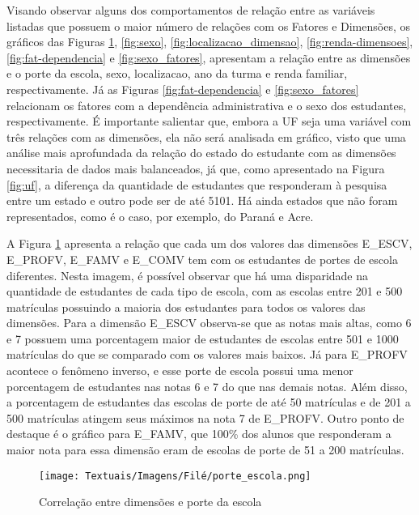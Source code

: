 Visando observar alguns dos comportamentos de relação entre as variáveis listadas que possuem o maior número de relações com os Fatores e Dimensões, os gráficos das Figuras \ref{fig:porte_escola}, \ref{fig:sexo}, \ref{fig:localizacao_dimensao}, \ref{fig:renda-dimensoes}, \ref{fig:fat-dependencia} e \ref{fig:sexo_fatores}, apresentam a relação entre as dimensões e o porte da escola, sexo, localizacao, ano da turma e renda familiar, respectivamente. Já as Figuras \ref{fig:fat-dependencia} e \ref{fig:sexo_fatores} relacionam os fatores com a dependência administrativa e o sexo dos estudantes, respectivamente. É importante salientar que, embora a UF seja uma variável com três relações com as dimensões, ela não será analisada em gráfico, visto que uma análise mais aprofundada da relação do estado do estudante com as dimensões necessitaria de dados mais balanceados, já que, como apresentado na Figura \ref{fig:uf}, a diferença da quantidade de estudantes que responderam à pesquisa entre um estado e outro pode ser de até 5101. Há ainda estados que não foram representados, como é o caso, por exemplo, do Paraná e Acre.

A Figura \ref{fig:porte_escola} apresenta a relação que cada um dos valores das dimensões E\_ESCV, E\_PROFV, E\_FAMV e E\_COMV tem com os estudantes de portes de escola diferentes. Nesta imagem, é possível observar que há uma disparidade na quantidade de estudantes de cada tipo de escola, com as escolas entre 201 e 500 matrículas possuindo a maioria dos estudantes para todos os valores das dimensões. Para a dimensão E\_ESCV observa-se que as notas mais altas, como 6 e 7 possuem uma porcentagem maior de estudantes de escolas entre 501 e 1000 matrículas do que se comparado com os valores mais baixos. Já para E\_PROFV acontece o fenômeno inverso, e esse porte de escola possui uma menor porcentagem de estudantes nas notas 6 e 7 do que nas demais notas. Além disso, a porcentagem de estudantes das escolas de porte de até 50 matrículas e de 201 a 500 matrículas atingem seus máximos na nota 7 de E\_PROFV. Outro ponto de destaque é o gráfico para E\_FAMV, que 100\% dos alunos que responderam a maior nota para essa dimensão eram de escolas de porte de 51 a 200 matrículas.

\begin{figure}[ht!]
    \centering
    \caption{Correlação entre dimensões e porte da escola}
    \texttt{[image: Textuais/Imagens/Filé/porte\_escola.png]}
    \label{fig:porte_escola}
\end{figure}

